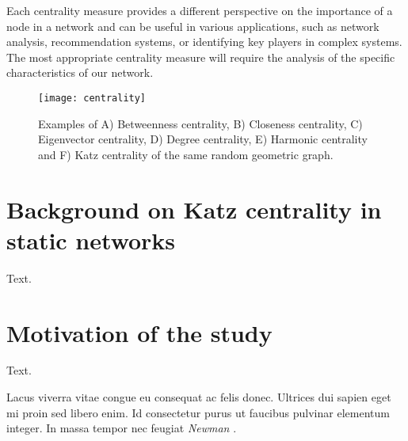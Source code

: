 Each centrality measure provides a different perspective on the importance of a node in a network and can be useful in various applications, such as network analysis, recommendation systems, or identifying key players in complex systems. The most appropriate centrality measure will require the analysis of the specific characteristics of our network.

\begin{figure}[htbp]\centering
	\texttt{[image: centrality]}
	\caption{Examples of A) Betweenness centrality, B) Closeness centrality, C) Eigenvector centrality, D) Degree centrality, E) Harmonic centrality and F) Katz centrality of the same random geometric graph.}
	\label{centrality}
	\bigskip
\end{figure}

\section{Background on Katz centrality in static networks}
\label{sec:back}
Text.

\section{Motivation of the study}
\label{sec:motiv}
Text.


Lacus viverra vitae congue eu consequat ac felis donec. Ultrices dui sapien eget mi proin sed libero enim. Id consectetur purus ut faucibus pulvinar elementum integer. In massa tempor nec feugiat \textsl{Newman} \cite{newman2018networks}.
